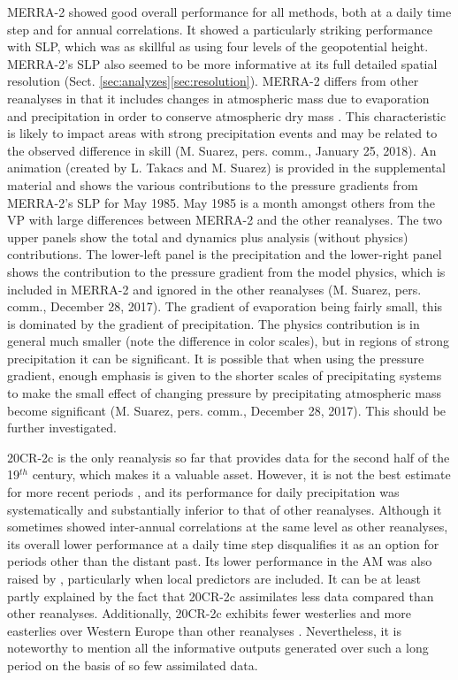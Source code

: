 \documentclass[smallextended]{svjour3}       %
\begin{document}
	MERRA-2 showed good overall performance for all methods, both at a daily time step and for annual correlations. It showed a particularly striking performance with SLP, which was as skillful as using four levels of the geopotential height. MERRA-2's SLP also seemed to be more informative at its full detailed spatial resolution (Sect. \ref{sec:analyzes}\ref{sec:resolution}). MERRA-2 differs from other reanalyses in that it includes changes in atmospheric mass due to evaporation and precipitation in order to conserve atmospheric dry mass \cite{Gelaro2017}. This characteristic is likely to impact areas with strong precipitation events and may be related to the observed difference in skill (M. Suarez, pers. comm., January 25, 2018). An animation (created by L. Takacs and M. Suarez) is provided in the supplemental material and shows the various contributions to the pressure gradients from MERRA-2's SLP for May 1985. May 1985 is a month amongst others from the VP with large differences between MERRA-2 and the other reanalyses. The two upper panels show the total and dynamics plus analysis (without physics) contributions. The lower-left panel is the precipitation and the lower-right panel shows the contribution to the pressure gradient from the model physics, which is included in MERRA-2 and ignored in the other reanalyses (M. Suarez, pers. comm., December 28, 2017). The gradient of evaporation being fairly small, this is dominated by the gradient of precipitation. The physics contribution is in general much smaller (note the difference in color scales), but in regions of strong precipitation it can be significant. It is possible that when using the pressure gradient, enough emphasis is given to the shorter scales of precipitating systems to make the small effect of changing pressure by precipitating atmospheric mass become significant (M. Suarez, pers. comm., December 28, 2017). This should be further investigated.
	
	20CR-2c is the only reanalysis so far that provides data for the second half of the 19$^{th}$ century, which makes it a valuable asset. However, it is not the best estimate for more recent periods \citep{Poli2017}, and its performance for daily precipitation was systematically and substantially inferior to that of other reanalyses. Although it sometimes showed inter-annual correlations at the same level as other reanalyses, its overall lower performance at a daily time step disqualifies it as an option for periods other than the distant past. Its lower performance in the AM was also raised by \citet[][]{Dayon2015}, particularly when local predictors are included. It can be at least partly explained by the fact that 20CR-2c assimilates less data compared than other reanalyses. Additionally, 20CR-2c exhibits fewer westerlies and more easterlies over Western Europe than other reanalyses \citep{Rohrer2018}. Nevertheless, it is noteworthy to mention all the informative outputs generated over such a long period on the basis of so few assimilated data.
	
\end{document}
